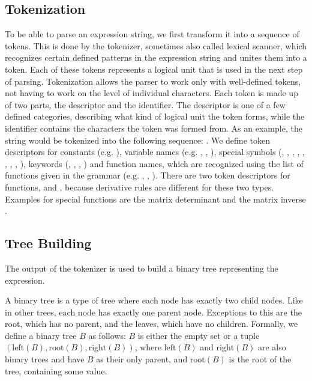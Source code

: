 \documentclass[12pt, a4paper]{report}
\begin{document}
\subsection{Tokenization}
To be able to parse an expression string, we first transform it into a sequence of tokens.
This is done by the tokenizer, sometimes also called lexical scanner, which recognizes certain defined patterns in the expression string and unites them into a token.
Each of these tokens represents a logical unit that is used in the next step of parsing.
Tokenization allows the parser to work only with well-defined tokens, not having to work on the level of individual characters.
Each token is made up of two parts, the descriptor and the identifier.
The descriptor is one of a few defined categories, describing what kind of logical unit the token forms, while the identifier contains the characters the token was formed from.
As an example, the string  would be tokenized into the following sequence: .
We define token descriptors for constants (e.g. ), variable names (e.g. , , ), special symbols (, , , , , , , , ), keywords (, , , ) and function names, which are recognized using the list of functions given in the grammar (e.g. , , ).
There are two token descriptors for functions,  and , because derivative rules are different for these two types.
Examples for special functions are the matrix determinant  and the matrix inverse .

\subsection{Tree Building}
The output of the tokenizer is used to build a binary tree representing the expression.

A binary tree is a type of tree where each node has exactly two child nodes.
Like in other trees, each node has exactly one parent node.
Exceptions to this are the root, which has no parent, and the leaves, which have no children.
Formally, we define a binary tree $B$ as follows:
$B$ is either the empty set or a tuple $(\text{left}(B),\text{root}(B),\text{right}(B))$, where $\text{left}(B)$ and $\text{right}(B)$ are also binary trees and have $B$ as their only parent, and $\text{root}(B)$ is the root of the tree, containing some value.
\end{document}
